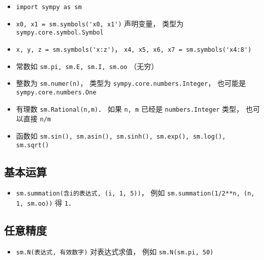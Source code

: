 
\begin{issues}
\issueDraft
\end{issues}


\begin{itemize}
\item \verb|import sympy as sm|
\item \verb|x0, x1 = sm.symbols('x0, x1')| 声明变量， 类型为 \verb|sympy.core.symbol.Symbol|
\item \verb|x, y, z = sm.symbols('x:z')|， \verb|x4, x5, x6, x7 = sm.symbols('x4:8')|
\item 常数如 \verb|sm.pi, sm.E, sm.I, sm.oo| （无穷）
\item 整数为 \verb|sm.numer(n)|， 类型为 \verb|sympy.core.numbers.Integer|， 也可能是 \verb|sympy.core.numbers.One|
\item 有理数 \verb|sm.Rational(n,m)|． 如果 \verb|n, m| 已经是 \verb|numbers.Integer| 类型， 也可以直接 \verb|n/m|
\item 函数如 \verb|sm.sin(), sm.asin(), sm.sinh(), sm.exp(), sm.log(), sm.sqrt()|
\end{itemize}

\subsection{基本运算}
\begin{itemize}
\item \verb|sm.summation(含i的表达式, (i, 1, 5))|， 例如 \verb|sm.summation(1/2**n, (n, 1, sm.oo))| 得 \verb|1|．
\end{itemize}

\subsection{任意精度}
\begin{itemize}
\item \verb|sm.N(表达式, 有效数字)| 对表达式求值， 例如 \verb|sm.N(sm.pi, 50)|
\end{itemize}

